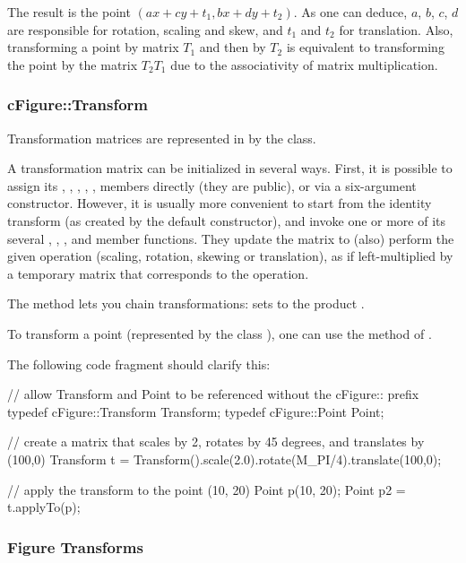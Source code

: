 The result is the point $(ax+cy+t_1, bx+dy+t_2)$. As one can deduce, $a$,
$b$, $c$, $d$ are responsible for rotation, scaling and skew, and $t_1$ and
$t_2$ for translation. Also, transforming a point by matrix $T_1$ and then by
$T_2$ is equivalent to transforming the point by the matrix $T_2 T_1$ due to
the associativity of matrix multiplication.


\subsubsection{cFigure::Transform}

Transformation matrices are represented in {\opp} by the 
class.

A  transformation matrix can be initialized in
several ways. First, it is possible to assign its , ,
, , ,  members directly (they are public), or
via a six-argument constructor. However, it is usually more convenient to
start from the identity transform (as created by the default constructor), and
invoke one or more of its several , ,
,  and  member functions.
They update the matrix to (also) perform the given operation (scaling,
rotation, skewing or translation), as if left-multiplied by a temporary
matrix that corresponds to the operation.

The  method lets you chain transformations: 
sets  to the product .

To transform a point (represented by the class ),
one can use the  method of .

The following code fragment should clarify this:

\begin{cpp}
// allow Transform and Point to be referenced without the cFigure:: prefix
typedef cFigure::Transform Transform;
typedef cFigure::Point Point;

// create a matrix that scales by 2, rotates by 45 degrees, and translates by (100,0)
Transform t = Transform().scale(2.0).rotate(M_PI/4).translate(100,0);

// apply the transform to the point (10, 20)
Point p(10, 20);
Point p2 = t.applyTo(p);
\end{cpp}


\subsubsection{Figure Transforms}


